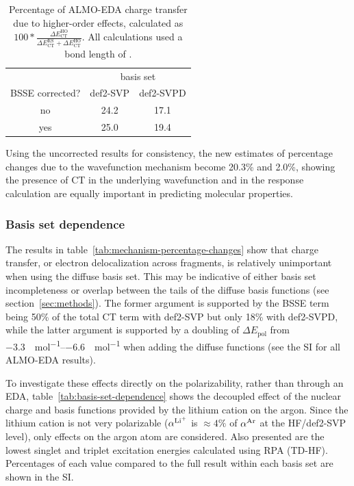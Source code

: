\documentclass[%
  class = book,%
  crop = false,%
  float = true,%
  multi = true,%
  preview = false,%
]{standalone}
\begin{document}
\begin{table}
  \centering
  \caption[Higher-order ALMO-EDA charge transfer in argon\textemdash{}lithium cation dimer]{Percentage of ALMO-EDA charge transfer due to higher-order effects, calculated as \(100 * \frac{\Delta E_{\text{CT}}^{\text{HO}}}{\Delta E_{\text{CT}}^{\text{RS}} + \Delta E_{\text{CT}}^{\text{HO}}}\). All calculations used a bond length of \geomdeftsvpd{}.}
  \label{tab:almo-eda-higher-order-pct-of-ct}
  \begin{tabular}{ccc}
    \toprule
                & \multicolumn{2}{c}{basis set} \\
                  \cmidrule{2-3}
    BSSE corrected? & def2-SVP    & def2-SVPD   \\
    \midrule
    no              & 24.2        & 17.1        \\
    yes             & 25.0        & 19.4        \\
    \bottomrule
  \end{tabular}
\end{table}

Using the uncorrected results for consistency, the new estimates of percentage changes due to the wavefunction mechanism become 20.3\% and 2.0\%, showing the presence of CT in the underlying wavefunction and in the response calculation are equally important in predicting molecular properties.

\subsubsection{Basis set dependence}
\label{sssec:basis-set-dependence}

The results in table~\ref{tab:mechanism-percentage-changes} show that charge transfer, or electron delocalization across fragments, is relatively unimportant when using the diffuse basis set. This may be indicative of either basis set incompleteness or overlap between the tails of the diffuse basis functions (see section~\ref{sec:methods}). The former argument is supported by the BSSE term being 50\% of the total CT term with def2-SVP but only 18\% with def2-SVPD, while the latter argument is supported by a doubling of \(\Delta E_{\text{pol}}\) from \SIrange{-3.3}{-6.6}{\kcal\per\mol} when adding the diffuse functions (see the SI for all ALMO-EDA results).

To investigate these effects directly on the polarizability, rather than through an EDA, table~\ref{tab:basis-set-dependence} shows the decoupled effect of the nuclear charge and basis functions provided by the lithium cation on the argon. Since the lithium cation is not very polarizable (\(\alpha^{\ce{Li+}}\) is \(\approx 4\%\) of \(\alpha^{\ce{Ar}}\) at the HF/def2-SVP level), only effects on the argon atom are considered. Also presented are the lowest singlet and triplet excitation energies calculated using RPA (TD-HF). Percentages of each value compared to the full \arlidimer{} result within each basis set are shown in the SI.
\end{document}
